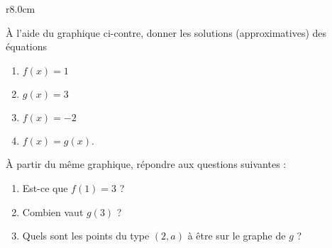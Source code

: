 
\begin{exercice}\label{exoSeconde-0070}

\begin{wrapfigure}{r}{8.0cm}
   \vspace{-0.5cm}        %
   \centering
   
\end{wrapfigure}

        À l'aide du graphique ci-contre, donner les solutions (approximatives) des équations
        \begin{enumerate}
            \item
                \( f(x)=1\)
            \item
                \( g(x)=3\)
            \item
                \( f(x)=-2\)
            \item
                $f(x)=g(x)$.
        \end{enumerate}

        À partir du même graphique, répondre aux questions suivantes :
        \begin{enumerate}
            \item
                Est-ce que \( f(1)=3\) ?
            \item
                Combien vaut \( g(3)\) ?
            \item
                Quels sont les points du type \( (2,a)\) à être sur le graphe de \( g\) ?
        \end{enumerate}

\end{exercice}
